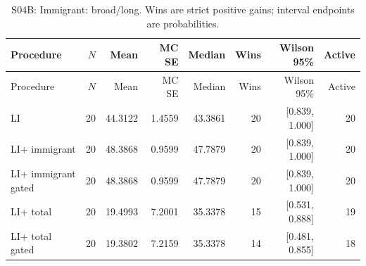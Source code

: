 \begin{longtable}{@{}lrrrrrrr@{}}

\caption{S04B: Immigrant: broad/long. Wins are strict positive gains; interval endpoints are probabilities.}\label{tab:s04b-5}\\

\toprule Procedure & $N$ & Mean & MC SE & Median & Wins & Wilson 95\% & Active \\

\midrule\endfirsthead

\toprule Procedure & $N$ & Mean & MC SE & Median & Wins & Wilson 95\% & Active \\

\midrule\endhead

\bottomrule\endlastfoot

LI & 20 & 44.3122 & 1.4559 & 43.3861 & 20 & [0.839, 1.000] & 20 \\

LI+ immigrant & 20 & 48.3868 & 0.9599 & 47.7879 & 20 & [0.839, 1.000] & 20 \\

LI+ immigrant gated & 20 & 48.3868 & 0.9599 & 47.7879 & 20 & [0.839, 1.000] & 20 \\

LI+ total & 20 & 19.4993 & 7.2001 & 35.3378 & 15 & [0.531, 0.888] & 19 \\

LI+ total gated & 20 & 19.3802 & 7.2159 & 35.3378 & 14 & [0.481, 0.855] & 18 \\

\end{longtable}\endgroup

\clearpage

\begingroup\footnotesize\setlength{\tabcolsep}{3pt}

